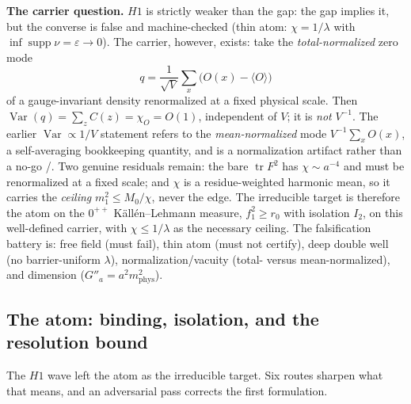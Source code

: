 \documentclass[11pt,a4paper]{article}
\newcommand{\labb}[2]{\fcolorbox{#1!35}{#1!8}{\textcolor{#1}{\textbf{\scriptsize #2}}}}
\newcommand{\LT}{\labb{cT}{T}}
\newcommand{\LE}{\labb{cE}{E}}
\begin{document}
\textbf{The carrier question.} $H1$ is strictly weaker than the gap: the gap implies it, but the
converse is false and machine-checked (thin atom: $\chi=1/\lambda$ with
$\inf\operatorname{supp}\nu=\varepsilon\to0$). The carrier, however, exists: take the
\emph{total-normalized} zero mode
\[
  q=\frac{1}{\sqrt V}\sum_x\bigl(O(x)-\langle O\rangle\bigr)
\]
of a gauge-invariant density renormalized at a fixed physical scale. Then
$\operatorname{Var}(q)=\sum_z C(z)=\chi_O=O(1)$, independent of $V$; it is \emph{not} $V^{-1}$. The
earlier $\operatorname{Var}\propto1/V$ statement refers to the \emph{mean-normalized} mode
$V^{-1}\sum_xO(x)$, a self-averaging bookkeeping quantity, and is a normalization artifact rather than
a no-go \LT/\LE. Two genuine residuals remain: the bare $\operatorname{tr}F^2$ has
$\chi\sim a^{-4}$ and must be renormalized at a fixed scale; and $\chi$ is a residue-weighted harmonic
mean, so it carries the \emph{ceiling} $m_1^2\le M_0/\chi$, never the edge. The irreducible target is
therefore the atom on the $0^{++}$ K\"all\'en--Lehmann measure, $f_1^2\ge r_0$ with isolation $I_2$,
on this well-defined carrier, with $\chi\le1/\lambda$ as the necessary ceiling. The falsification
battery is: free field (must fail), thin atom (must not certify), deep double well (no
barrier-uniform $\lambda$), normalization/vacuity (total- versus mean-normalized), and dimension
($G''_a=a^2m_{\mathrm{phys}}^2$).

\subsection{The atom: binding, isolation, and the resolution bound}
\label{sec:atom}

The $H1$ wave left the atom as the irreducible target. Six routes sharpen what that means, and an
adversarial pass corrects the first formulation.
\end{document}

